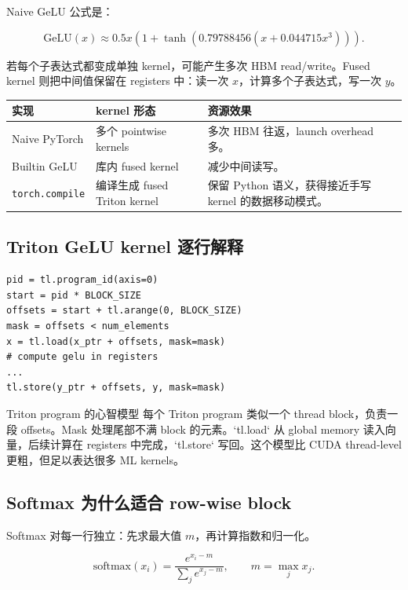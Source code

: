 \documentclass[a4paper]{article}
\begin{document}
Naive GeLU 公式是：

\[
\mathrm{GeLU}(x)\approx 0.5x\left(1+\tanh\left(0.79788456(x+0.044715x^3)\right)
\right).
\]

若每个子表达式都变成单独 kernel，可能产生多次 HBM read/write。Fused kernel 则把中间值保留在 registers 中：读一次 \(x\)，计算多个子表达式，写一次 \(y\)。

\begin{longtable}{p{}p{}p{}}
\toprule
\textbf{实现} & \textbf{kernel 形态} & \textbf{资源效果} \\
\midrule
Naive PyTorch & 多个 pointwise kernels & 多次 HBM 往返，launch overhead 多。 \\
Builtin GeLU & 库内 fused kernel & 减少中间读写。 \\
\texttt{torch.compile} & 编译生成 fused Triton kernel & 保留 Python 语义，获得接近手写 kernel 的数据移动模式。 \\
\bottomrule
\end{longtable}

\subsection{Triton GeLU kernel 逐行解释}

\begin{lstlisting}[caption={Triton GeLU kernel 核心结构}]
pid = tl.program_id(axis=0)
start = pid * BLOCK_SIZE
offsets = start + tl.arange(0, BLOCK_SIZE)
mask = offsets < num_elements
x = tl.load(x_ptr + offsets, mask=mask)
# compute gelu in registers
...
tl.store(y_ptr + offsets, y, mask=mask)
\end{lstlisting}

\begin{knowledgebox}{Triton program 的心智模型}
每个 Triton program 类似一个 thread block，负责一段 offsets。Mask 处理尾部不满 block 的元素。`tl.load` 从 global memory 读入向量，后续计算在 registers 中完成，`tl.store` 写回。这个模型比 CUDA thread-level 更粗，但足以表达很多 ML kernels。
\end{knowledgebox}

\subsection{Softmax 为什么适合 row-wise block}

Softmax 对每一行独立：先求最大值 \(m\)，再计算指数和归一化。

\[
\mathrm{softmax}(x_i)=\frac{e^{x_i-m}}{\sum_j e^{x_j-m}},\qquad m=\max_j x_j.
\]
\end{document}

